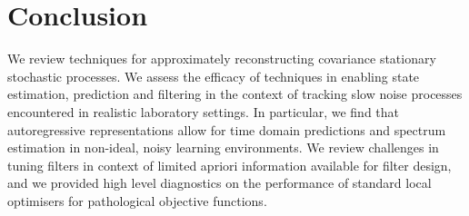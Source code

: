 \section{Conclusion}
We review techniques for approximately reconstructing covariance stationary stochastic processes. We assess the efficacy of techniques in enabling state estimation, prediction and filtering in the context of tracking slow noise processes encountered in realistic laboratory settings. In particular, we find that autoregressive representations allow for time domain predictions and spectrum estimation in non-ideal, noisy learning environments. We review challenges in tuning filters in context of limited apriori information available for filter design, and we provided high level diagnostics on the performance of standard local optimisers for pathological objective functions. 
